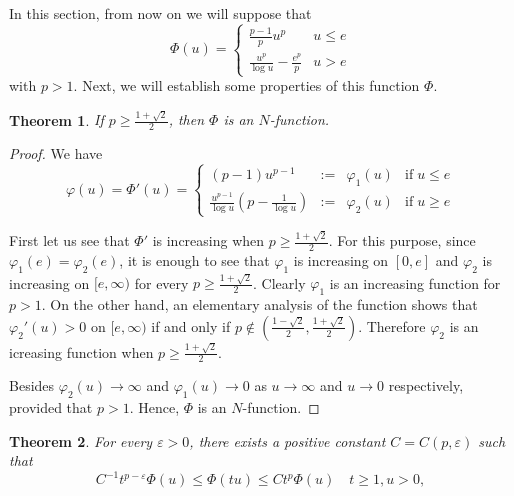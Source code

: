 \documentclass[twoside]{article}
\newtheorem{thm}{Theorem}[section]
\theoremstyle{remark}
\renewcommand{\leq}{\leqslant}
\renewcommand{\geq}{\geqslant}
\begin{document}
In this section, from now on we will suppose that
\[\Phi(u)=
\left\{
\begin{array}{ll}
\frac{p-1}{p}u^p&u\leq e
\\
\frac{u^p}{\log u}-\frac{e^p}{p}&u>e
\end{array}
\right.\]
with $p>1$. Next, we will establish some properties of this function $\Phi$.

\begin{thm}
If $p\geq \frac{1+\sqrt 2}{2}$, then $\Phi$ is an $N$-function.
\end{thm}


\begin{proof}
We have
\[\varphi(u)=\Phi'(u)=\left\{
\begin{array}{cccc}
(p-1)u^{p-1}&:=&\varphi_1(u)& \mbox{if}\;u\leq e
\\
\frac{u^{p-1}}{\log u}(p-\frac{1}{\log u})&:=&\varphi_2(u)&\mbox{if}\; u\geq e
\end{array}
\right.
\]

First let us see that $\Phi'$ is increasing when $p\geq \frac{1+\sqrt {2}}{2}$.
For this purpose, since $\varphi_1(e)=\varphi_2(e)$, it is enough to see that $\varphi_1$ is increasing  on $[0,e]$ and $\varphi_2$ is increasing on
$[e,\infty)$ for every $p\geq \frac{1+\sqrt {2}}{2}$. Clearly
$\varphi_1$ is an increasing function for $p>1$.  On the other hand, an elementary analysis of the function shows that
$\varphi_2'(u)>0$ on $[e,\infty)$ if and only if
 $p \notin(\frac{1-\sqrt2}{2},\frac{1+\sqrt2}{2})$.  Therefore $\varphi_2$ is an icreasing function when $p\geq \frac{1+\sqrt2}{2}$.

 Besides $\varphi_2(u)\to \infty$ and  $\varphi_1(u)\to 0$  as $u \to  \infty$ and $u\to 0$  respectively, provided that $p>1$. Hence, $\Phi$ is an $N$-function.
\end{proof}


\begin{thm} For every $\varepsilon>0$, there exists a positive constant $C=C(p,\varepsilon)$  such that
\begin{equation}\label{cota-sup-indices}
C^{-1}t^{p-\varepsilon}\Phi(u)\leq \Phi(tu) \leq Ct^p\Phi(u)\quad t\geq 1, u>0,
\end{equation}
\end{thm}
\end{document}
